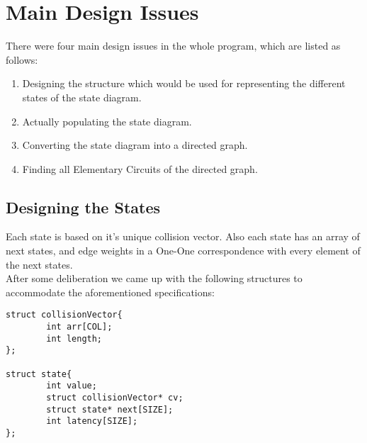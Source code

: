 \documentclass{article}
\begin{document}
\section{Main Design Issues}
There were four main design issues in the whole program, which are listed as follows:
\begin{enumerate}
    \item Designing the structure which would be used for representing the different states of the state diagram.
    \item Actually populating the state diagram.
    \item Converting the state diagram into a directed graph.
    \item Finding all Elementary Circuits of the directed graph.
\end{enumerate}

\subsection{Designing the States}
Each state is based on it's unique collision vector. Also each state has an array of next states, and edge weights in a One-One correspondence with every element of the next states.\\
After some deliberation we came up with the following structures to accommodate the aforementioned specifications:

\begin{verbatim}
struct collisionVector{
	    int arr[COL];
	    int length;
};

struct state{ 
	    int value;
	    struct collisionVector* cv;
	    struct state* next[SIZE];
	    int latency[SIZE];
};
\end{verbatim}
\end{document}
